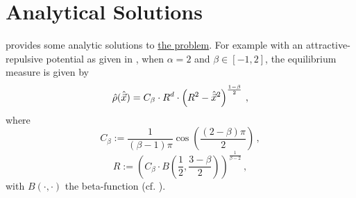 \section{Analytical Solutions}
\label{sec:analytical-solutions}
\cite{2017-explicit-solutions} provides some analytic solutions to \hyperref[def:the-problem]{the problem}.
For example with an attractive-repulsive potential as given in , when $\alpha = 2$ and $\beta \in [-1, 2]$, the equilibrium measure is given by
\begin{equation}
  \hat{\rho}(\hat{\vec{x}}) = C_\beta \cdot R^d \cdot \left(R^2 - \hat{\vec{x}}^2\right)^{\frac{1-\beta}{2}}\,,
  \label{eq:analytical-solution-alpha-equal-2}
\end{equation}
where
$$C_\beta := \frac{1}{(\beta - 1) \pi} \cos\left(\frac{(2 - \beta) \pi}{2}\right)\,,$$
$$R := \left(C_\beta \cdot B\left(\frac{1}{2}, \frac{3 - \beta}{2}\right)\right)^{\frac{1}{\beta - 2}}\,,$$
with $B(\cdot, \cdot)$ the beta-function (cf. ).

